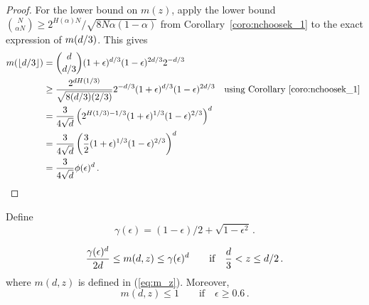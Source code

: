 \begin{proof}
For the lower bound on $m(z)$, apply the lower bound ${N \choose \alpha N} \geq 2^{H(\alpha)N}/\sqrt{8N\alpha (1-\alpha)}$ from Corollary~\ref{coro:nchoosek_1} to the exact expression of $m( d/3)$. This gives 
\begin{align*}
m( \lfloor d/3 \rfloor )
&= {d \choose d/3} 
(1+\epsilon)^{d/3} 
(1-\epsilon)^{2d/3} 
2^{-d/3} \nonumber \\
&\geq \frac{2^{d H(1/3)}}{\sqrt{8(d/3)(2/3)}} 2^{-d/3} 
(1+\epsilon)^{d/3} 
(1-\epsilon)^{2d/3} 
\nonumber \quad \text{using Corollary~\ref{coro:nchoosek_1} } \\
&= \frac{3}{4\sqrt{d}}\left(2^{H(1/3) - 1/3} (1+\epsilon)^{1/3} (1-\epsilon)^{2/3}\right)^d \nonumber \\
&= \frac{3}{4\sqrt{d}}\left(\frac{3}{2} (1+\epsilon)^{1/3} (1-\epsilon)^{2/3}\right)^d \\
&= \frac{3}{4\sqrt{d}}\phi(\epsilon)^d \, .
\end{align*}

\end{proof}





Define
\begin{equation}\label{eq:praos-func-gamma}
  \gamma(\epsilon) = (1-\epsilon)/2 + \sqrt{1-\epsilon^2}
  \,.
\end{equation}


\begin{claim}\label{claim:t2star-exact}
\[
\frac{\gamma(\epsilon)^d}{2d}
\leq
m(d, z) 
\leq
\gamma(\epsilon)^d 
\qquad \text{if}\quad \frac{d}{3} < z \leq d/2
\, .
\]
where $m(d, z)$ is defined in (\ref{eq:m_z}). Moreover, 
\[
m(d, z) \leq 1
\qquad \text{if}\quad \epsilon \geq 0.6\,.
\]
\end{claim}


